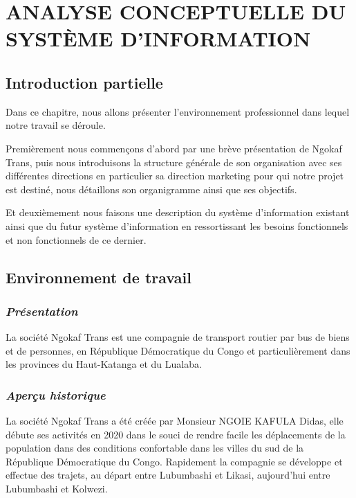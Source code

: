 \chapter[ANALYSE CONCEPTUELLE DU SYSTÈME D’INFORMATION]{ANALYSE CONCEPTUELLE DU SYSTÈME D’INFORMATION}
    \section[Introduction partielle]{Introduction partielle}
    Dans ce chapitre, nous allons présenter l’environnement professionnel dans lequel notre
    travail se déroule.
    \par
    Premièrement nous commençons d’abord par une brève présentation de Ngokaf Trans, puis nous introduisons
    la structure générale de son organisation avec ses différentes directions en particulier
    sa direction marketing pour qui notre projet est destiné, nous détaillons son organigramme ainsi
    que ses objectifs. 
    \par
    Et deuxièmement nous faisons une description du système d’information existant ainsi
    que du futur système d’information en ressortissant les besoins fonctionnels et non
    fonctionnels de ce dernier.
    \section[Environnement de travail]{Environnement de travail}
        \subsection[Présentation]{\textit{Présentation}}
        La société Ngokaf Trans est une compagnie de transport routier
        par bus de biens et de personnes, en République Démocratique du Congo
        et particulièrement dans les provinces du Haut-Katanga et du Lualaba.

        \subsection[Aperçu historique]{\textit{Aperçu historique}}
        La société Ngokaf Trans a été créée par Monsieur NGOIE KAFULA Didas,
        elle débute ses activités en 2020 dans le
        souci de rendre facile les déplacements de la population dans des conditions confortable
        dans les villes du sud de la République Démocratique du Congo.
        Rapidement la compagnie se développe et effectue des trajets, au départ
        entre Lubumbashi et Likasi, aujourd’hui entre Lubumbashi
        et Kolwezi. 

